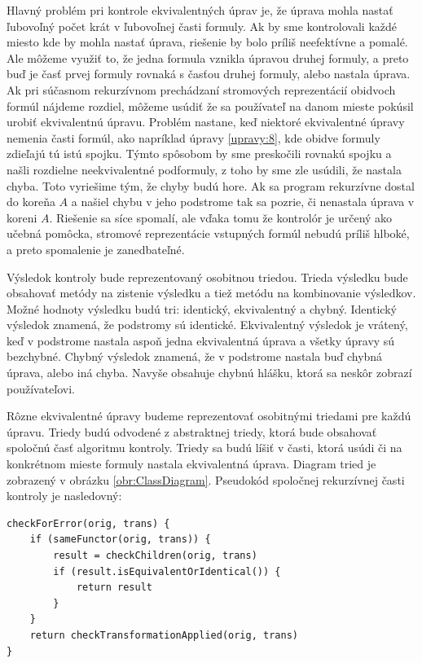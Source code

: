 Hlavný problém pri kontrole ekvivalentných úprav je, že úprava mohla nastať ľubovoľný počet krát v ľubovoľnej časti formuly. Ak by sme kontrolovali každé miesto kde by mohla nastať úprava, riešenie by bolo príliš neefektívne a pomalé. Ale môžeme využiť to, že jedna formula vznikla úpravou druhej formuly, a preto buď je časť prvej formuly rovnaká s časťou druhej formuly, alebo nastala úprava. Ak pri súčasnom rekurzívnom prechádzaní stromových reprezentácií obidvoch formúl nájdeme rozdiel, môžeme usúdiť že sa používateľ na danom mieste pokúsil urobiť ekvivalentnú úpravu. Problém nastane, keď niektoré ekvivalentné úpravy nemenia časti formúl, ako napríklad úpravy \eqref{upravy:8}, kde obidve formuly zdieľajú tú istú spojku. Týmto spôsobom by sme preskočili rovnakú spojku a našli rozdielne neekvivalentné podformuly, z toho by sme zle usúdili, že nastala chyba. Toto vyriešime tým, že chyby budú  hore. Ak sa program rekurzívne dostal do koreňa $A$ a našiel chybu v jeho podstrome tak sa pozrie, či nenastala úprava v koreni $A$. Riešenie sa síce spomalí, ale vďaka tomu že kontrolór je určený ako učebná pomôcka, stromové reprezentácie vstupných formúl nebudú príliš hlboké, a preto spomalenie je zanedbateľné.

Výsledok kontroly bude reprezentovaný osobitnou triedou. Trieda výsledku bude obsahovať metódy na zistenie výsledku a tiež metódu na kombinovanie výsledkov. Možné hodnoty výsledku budú tri: identický, ekvivalentný a chybný. Identický výsledok znamená, že podstromy sú identické. Ekvivalentný výsledok je vrátený, keď v podstrome nastala aspoň jedna ekvivalentná úprava a všetky úpravy sú bezchybné. Chybný výsledok znamená, že v podstrome nastala buď chybná úprava, alebo iná chyba. Navyše obsahuje chybnú hlášku, ktorá sa neskôr zobrazí používateľovi. 

\label{checkeralgorithm}Rôzne ekvivalentné úpravy budeme reprezentovať osobitnými triedami pre každú úpravu. Triedy budú odvodené z abstraktnej triedy, ktorá bude obsahovať spoločnú časť algoritmu kontroly. Triedy sa budú líšiť v časti, ktorá usúdi či na konkrétnom mieste formuly nastala ekvivalentná úprava. Diagram tried je zobrazený v obrázku \eqref{obr:ClassDiagram}. Pseudokód spoločnej rekurzívnej časti kontroly je nasledovný:

\begin{lstlisting}[]
checkForError(orig, trans) {
    if (sameFunctor(orig, trans)) {
        result = checkChildren(orig, trans)
        if (result.isEquivalentOrIdentical()) {
            return result
        }
    }
    return checkTransformationApplied(orig, trans)
}
\end{lstlisting}

